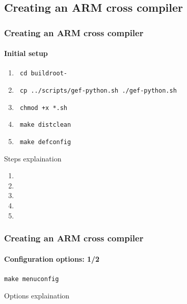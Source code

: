 \subsection{Creating an ARM cross compiler}
 {
  \begin{frame}
    \frametitle{Creating an ARM cross compiler}
    \framesubtitle{Initial setup}

    \begin{enumerate}
      \item \texttt{ cd buildroot-\buildrootLatestVersion }
      \item \texttt{ cp ../scripts/gef-python.sh ./gef-python.sh }
      \item \texttt{ chmod +x *.sh }
      \item \texttt{ make distclean }
      \item \texttt{ make defconfig }
    \end{enumerate}

  \end{frame}
   {
    Steps explaination
    \begin{enumerate}
      \item \enteringBuildRootDirectoryDescription
      \item \gefPythonDescription
      \item \scriptShouldBeExecutableDescription
      \item \makeCleanDescription
      \item \makeDefConfigDescription
    \end{enumerate}
  }

  \begin{frame}
    \frametitle{Creating an ARM cross compiler}
    \framesubtitle{Configuration options: 1/2}
    \texttt{make menuconfig}
    \begin{itemize}
      \targetOptionsList
      \buildOptionsList
    \end{itemize}
  \end{frame}
   {
    Options explaination \\
    \targetOptionsDescription \\
    \buildOptionsDescription
  }

}
